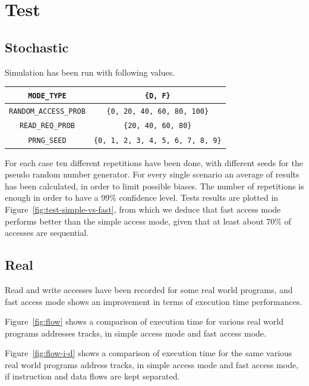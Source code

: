 \documentclass[a4paper,12pt]{article}
\begin{document}
\section{Test}
\subsection{Stochastic}
Simulation has been run with following values.

\begin{table}[H]
\center
\begin{tabular}{| c | c |}\hline
\texttt{MODE\_TYPE} & \texttt{\{D, F\}} \\ \hline
\texttt{RANDOM\_ACCESS\_PROB} & \texttt{\{0, 20, 40, 60, 80, 100\}} \\ \hline
\texttt{READ\_REQ\_PROB} & \texttt{\{20, 40, 60, 80\}} \\ \hline
\texttt{PRNG\_SEED} & \texttt{\{0, 1, 2, 3, 4, 5, 6, 7, 8, 9\}} \\ \hline
\end{tabular}
\end{table}

For each case ten different repetitions have been done, with different seeds for the pseudo random number generator. For every single scenario an average of results has been calculated, in order to limit possible biases. The number of repetitions is enough in order to have a 99\% confidence level.
Tests results are plotted in Figure~\ref{fig:test-simple-vs-fast}, from which we deduce that fast access mode performs better than the simple access mode, given that at least about 70\% of accesses are sequential.

\subsection{Real}
Read and write accesses have been recorded \cite{bib:tracing-team} for some real world programs, and fast access mode shows an improvement in terms of execution time performances.

Figure~\ref{fig:flow} shows a comparison of execution time for various real world programs addresses tracks, in simple access mode and fast access mode.

Figure~\ref{fig:flow-i-d} shows a comparison of execution time for the same various real world programs address tracks, in simple access mode and fast access mode, if instruction and data flows are kept separated.
\end{document}
